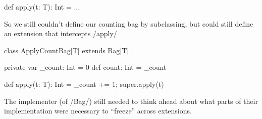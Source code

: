 \documentclass{ip3}
\begin{document}
\begin{foil}
\begin{note}
\begin{-scala}
{             def apply(t: T): Int               =  ...       
           }
        \end{-scala}

So we still couldn't define our counting bag by subclassing, but could  still
define an extension that intercepts \sc/apply/
        \begin{-scala}
        
           class ApplyCountBag[T] extends Bag[T] {
             private var _count: Int = 0
                     def count:  Int = _count
             
             def apply(t: T): Int =  { _count += 1; super.apply(t) }       
           }
        \end{-scala}
        
The implementer (of \sc/Bag/) still needed to think ahead 
about what parts of their implementation were necessary to
``freeze'' across extensions. 
\end{note}
\end{foil}
\end{document}
